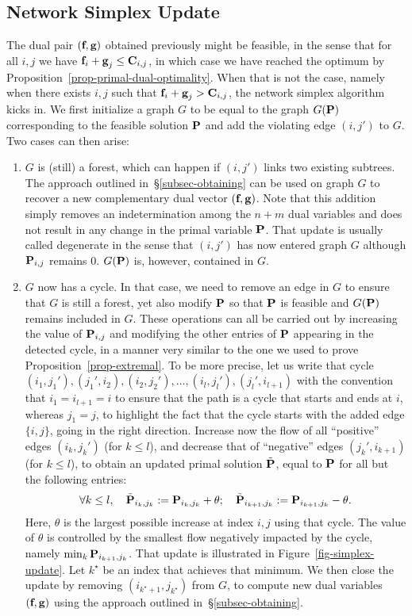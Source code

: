 \subsection{Network Simplex Update}
The dual pair $(\fD,\gD)$ obtained previously might be feasible, in the sense that for all $i,j$ we have $\fD_i+\gD_j\leq \C_{i,j}$, in which case we have reached the optimum by Proposition~\ref{prop-primal-dual-optimality}. When that is not the case, namely when there exists $i,j$ such that $\fD_i+\gD_j> \C_{i,j}$, the network simplex algorithm kicks in. We first initialize a graph $G$ to be equal to the graph $G(\P)$ corresponding to the feasible solution $\P$ and add the violating edge $(i,j')$ to $G$. Two cases can then arise:
\begin{enumerate}[label={(\alph*)}]
	\item $G$ is (still) a forest, which can happen if $(i,j')$ links two existing subtrees. The approach outlined in~\S\ref{subsec-obtaining} can be used on graph $G$ to recover a new complementary dual vector $(\fD,\gD)$. Note that this addition simply removes an indetermination among the $n+m$ dual variables and does not result in any change in the primal variable $\P$. That update is usually called degenerate in the sense that $(i,j')$ has now entered graph $G$ although $\P_{i,j}$ remains $0$. $G(\P)$ is, however, contained in $G$.
	
	\item $G$ now has a cycle. In that case, we need to remove an edge in $G$ to ensure that $G$ is still a forest, yet also modify $\P$ so that $\P$ is feasible and $G(\P)$ remains included in $G$. These operations can all be carried out by increasing the value of $\P_{i,j}$ and modifying the other entries of $\P$ appearing in the detected cycle, in a manner very similar to the one we used to prove Proposition~\ref{prop-extremal}. To be more precise, let us write that cycle $(i_1,j_1'), (j_1',i_2), (i_2,j_2'),\dots, (i_l,j_l'),(j_l',i_{l+1})$ with the convention that $i_1=i_{l+1}=i$ to ensure that the path is a cycle that starts and ends at $i$, whereas $j_1=j$, to highlight the fact that the cycle starts with the added edge $\{i,j\}$, going in the right direction. Increase now the flow of all ``positive'' edges $(i_k,j_k')$ (for $k\leq l$), and decrease that of ``negative'' edges $(j_k',i_{k+1})$ (for $k\leq l$), to obtain an updated primal solution $\tilde{\P}$, equal to $\P$ for all but the following entries:
$$\forall k\leq l,\quad \tilde{\P}_{i_k,j_k}:= \P_{i_k,j_k}+\theta;\quad \tilde{\P}_{i_{k+1},j_k}:= \P_{i_{k+1},j_k}-\theta.$$
Here, $\theta$ is the largest possible increase at index $i,j$ using that cycle. The value of $\theta$ is controlled by the smallest flow negatively impacted by the cycle, namely $\min_{k} \P_{i_{k+1},j_k}$. That update is illustrated in Figure~\ref{fig-simplex-update}. Let $k^\star$ be an index that achieves that minimum. We then close the update by removing $(i_{k^\star+1},j_{k^\star})$ from $G$, to compute new dual variables $(\fD,\gD)$ using the approach outlined in~\S\ref{subsec-obtaining}.  
\end{enumerate}
	
